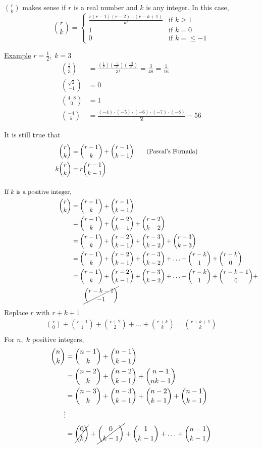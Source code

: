 \documentclass[12pt]{article}
\begin{document}
\vspace{1.5\baselineskip}
$\binom{r}{k}$ makes sense if $r$ is a real number and $k$ is any integer. In this case,
$$\binom{r}{k}=\begin{cases}
\frac{r(r-1)(r-2)\ldots(r-k+1)}{k!} & \text{if }k\ge 1\\
1&\text{if } k=0\\
0&\text{if } k=\le -1
\end{cases}$$

\underline{Example} $r=\frac{1}{2},\;k=3$
\begin{align*}
    \binom{\frac{1}{2}}{3} &= \frac{\left(\frac{1}{2}\right)\left(\frac{-1}{2}\right)\left(\frac{-3}{2}\right)}{3!} = \frac{3}{48} = \frac{1}{16} \\
    \binom{\sqrt{2}}{-1} &=0\\
    \binom{4\cdot 8}{0}  &= 1\\
    \binom{-4}{5} &= \frac{(-4)\cdot(-5)\cdot(-6)\cdot(-7)\cdot(-8)}{5!} -56
\end{align*}

It is still true that
\begin{align}
    \binom{r}{k} &= \binom{r-1}{k} + \binom{r-1}{k-1} \tag{Pascal's Formula}\\
    k\binom{r}{k} &= r\binom{r-1}{k-1} \nonumber\\
    \nonumber\\
\text{If $k$ is a positive integer,}\nonumber\\
    \binom{r}{k} &= \binom{r-1}{k} + \binom{r-1}{k-1}\nonumber\\
    &= \binom{r-1}{k} + \binom{r-2}{k-1} + \binom{r-2}{k-2}\nonumber\\
    &=\binom{r-1}{k} + \binom{r-2}{k-1} + \binom{r-3}{k-2} + \binom{r-3}{k-3}\nonumber\nonumber \\
    &= \binom{r-1}{k}+\binom{r-2}{k-1}+\binom{r-3}{k-2}+\ldots+\binom{r-k}{1}+\binom{r-k}{0}\nonumber \\
    &= \binom{r-1}{k}+\binom{r-2}{k-1}+\binom{r-3}{k-2}+\ldots+\binom{r-k}{1}+\binom{r-k-1}{0}+\nonumber \\
    &\qquad\cancel{\binom{r-k-1}{-1}} \nonumber
\end{align}
Replace $r$ with $r+k+1$
\begin{align}
    \binom{r}{0} + \binom{r+1}{1} + \binom{r+2}{2} + \ldots + \binom{r+k}{k}=\binom{r+k+1}{k} \tag{5.18} \\
\end{align}
For $n,\;k$ positive integers,
\begin{align*}
    \binom{n}{k} &= \binom{n-1}{k}+\binom{n-1}{k-1} \\
    &=\binom{n-2}{k} +\binom{n-2}{k-1}+\binom{n-1}{nk-1}\\
    &=\binom{n-3}{k}+\binom{n-3}{k-1}+\binom{n-2}{k-1}+\binom{n-1}{k-1}\\
    \vdots\\
    &=\cancel{\binom{0}{k}} + \cancel{\binom{0}{k-1}}+\binom{1}{k-1}+\ldots+\binom{n-1}{k-1}
\end{align*}
\end{document}
